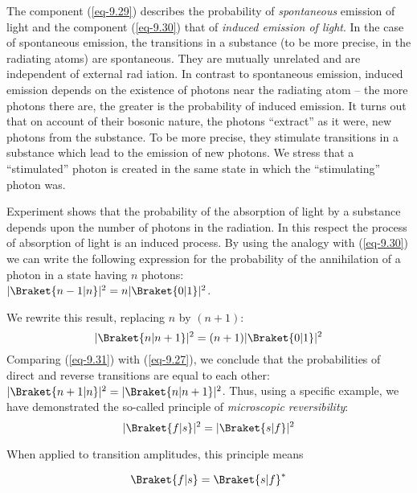 \documentclass[a4paper,sfsidenotes,colorlinks=true]{tufte-book}
\numberwithin{equation}{section}
\numberwithin{figure}{section}
\begin{document}
The component (\ref{eq-9.29}) describes the probability of
\emph{spontaneous} emission of light and the component (\ref{eq-9.30})
that of \emph{induced emission of light}. In the case of spontaneous
emission, the transitions in a substance (to be more precise, in the
radiating atoms) are spontaneous. They are mutually unrelated and are
independent of external rad iation. In contrast to spontaneous
emission, induced emission depends on the existence of photons near
the radiating atom -- the more photons there are, the greater is the
probability of induced emission. It turns out that on account of their
bosonic nature, the photons ``extract'' as it were, new photons from
the substance. To be more precise, they stimulate transitions in a
substance which lead to the emission of new photons. We stress that a
``stimulated'' photon is created in the same state in which the
``stimulating'' photon was. 


Experiment  shows that the
probability of the absorption of light by a substance depends upon the
number of photons in the radiation. In this respect the process of
absorption of light is an induced process. By using the analogy with
(\ref{eq-9.30}) we can write the following expression for the
probability of the annihilation of a photon in a state having $n$
photons:\\
 $|\Braket{n-1|n}|^{2} = n |\Braket{0|1}|^{2}$.

We rewrite this result, replacing $n$ by $(n + 1)$:
\begin{equation}%
|\Braket{n|n+1}|^{2} = (n+1) |\Braket{0|1}|^{2}
 \label{eq-9.31}
\end{equation}
Comparing (\ref{eq-9.31}) with (\ref{eq-9.27}), we conclude that the
probabilities of direct and reverse transitions are equal to each
other:\\ 
 $|\Braket{n+1|n}|^{2} =  |\Braket{n|n+1}|^{2}$.
Thus, using a specific example, we have demonstrated the
so-called principle of \emph{microscopic reversibility}:
\begin{equation}%
|\Braket{f|s}|^{2} = |\Braket{s|f}|^{2}
 \label{eq-9.32}
\end{equation}

When applied to transition amplitudes, this principle means

\begin{equation}%
\Braket{f|s} = \Braket{s|f}^{*}
 \label{eq-9.33}
\end{equation}
\end{document}
